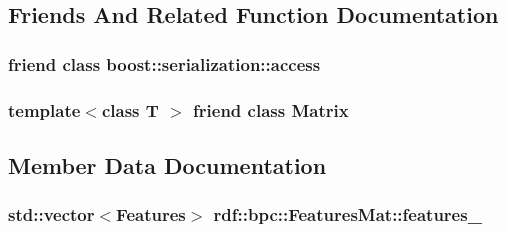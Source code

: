 \subsection{Friends And Related Function Documentation}
\subsubsection[{\texorpdfstring{boost\+::serialization\+::access}{boost::serialization::access}}]{\setlength{\rightskip}{0pt plus 5cm}friend class boost\+::serialization\+::access\hspace{0.3cm}{\ttfamily [friend]}}\hypertarget{classrdf_1_1bpc_1_1FeaturesMat_ac98d07dd8f7b70e16ccb9a01abf56b9c}{}\label{classrdf_1_1bpc_1_1FeaturesMat_ac98d07dd8f7b70e16ccb9a01abf56b9c}
\subsubsection[{\texorpdfstring{Matrix}{Matrix}}]{\setlength{\rightskip}{0pt plus 5cm}template$<$class T $>$ friend class {\bf Matrix}\hspace{0.3cm}{\ttfamily [friend]}}\hypertarget{classrdf_1_1bpc_1_1FeaturesMat_a6216d6f816a4e3b1567b5b11487815d8}{}\label{classrdf_1_1bpc_1_1FeaturesMat_a6216d6f816a4e3b1567b5b11487815d8}


\subsection{Member Data Documentation}
\subsubsection[{\texorpdfstring{features\+\_\+}{features_}}]{\setlength{\rightskip}{0pt plus 5cm}std\+::vector$<${\bf Features}$>$ rdf\+::bpc\+::\+Features\+Mat\+::features\+\_\+\hspace{0.3cm}{\ttfamily [private]}}\hypertarget{classrdf_1_1bpc_1_1FeaturesMat_a476cd5bf74e3808ea56e585db0083ceb}{}\label{classrdf_1_1bpc_1_1FeaturesMat_a476cd5bf74e3808ea56e585db0083ceb}


